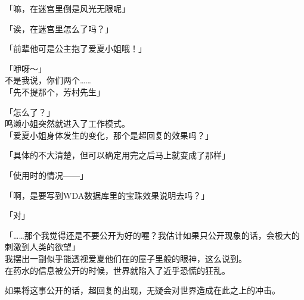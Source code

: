 「嘛，在迷宫里倒是风光无限呢」

「诶，在迷宫里怎么了吗？」

「前辈他可是公主抱了爱夏小姐哦！」

「咿呀～」\\

不是我说，你们两个……\\

「先不提那个，芳村先生」

「怎么了？」\\

鸣濑小姐突然就进入了工作模式。\\

「爱夏小姐身体发生的变化，那个是超回复的效果吗？」

「具体的不大清楚，但可以确定用完之后马上就变成了那样」

「使用时的情况——」

「啊，是要写到WDA数据库里的宝珠效果说明去吗？」

「对」

「……那个我觉得还是不要公开为好的喔？我估计如果只公开现象的话，会极大的刺激到人类的欲望」\\

我摆出一副似乎能透视爱夏他们在的屋子里般的眼神，这么说到。\\

在药水的信息被公开的时候，世界就陷入了近乎恐慌的狂乱。

如果将这事公开的话，超回复的出现，无疑会对世界造成在此之上的冲击。\\

